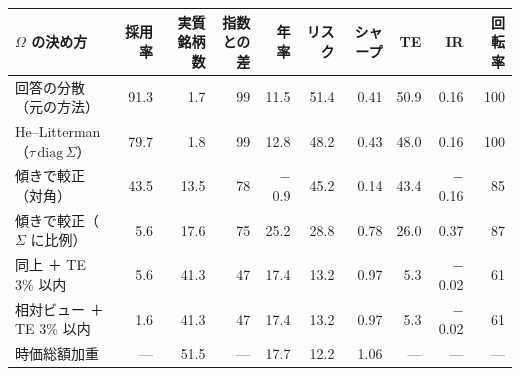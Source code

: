 \begin{tabular}{lrrrrrrrrr}
\toprule
$\Omega$ の決め方 & 採用率 & 実質銘柄数 & 指数との差 & 年率 & リスク & シャープ & TE & IR & 回転率 \\
\midrule
回答の分散（元の方法） & 91.3 & 1.7 & 99 & 11.5 & 51.4 & 0.41 & 50.9 & 0.16 & 100 \\
He–Litterman（$\tau\,\mathrm{diag}\,\Sigma$） & 79.7 & 1.8 & 99 & 12.8 & 48.2 & 0.43 & 48.0 & 0.16 & 100 \\
傾きで較正（対角） & 43.5 & 13.5 & 78 & \ensuremath{-}0.9 & 45.2 & 0.14 & 43.4 & \ensuremath{-}0.16 & 85 \\
傾きで較正（$\Sigma$ に比例） & 5.6 & 17.6 & 75 & 25.2 & 28.8 & 0.78 & 26.0 & 0.37 & 87 \\
同上 ＋ TE 3\% 以内 & 5.6 & 41.3 & 47 & 17.4 & 13.2 & 0.97 & 5.3 & \ensuremath{-}0.02 & 61 \\
相対ビュー ＋ TE 3\% 以内 & 1.6 & 41.3 & 47 & 17.4 & 13.2 & 0.97 & 5.3 & \ensuremath{-}0.02 & 61 \\
時価総額加重 & --- & 51.5 & --- & 17.7 & 12.2 & 1.06 & --- & --- & --- \\
\bottomrule
\end{tabular}
